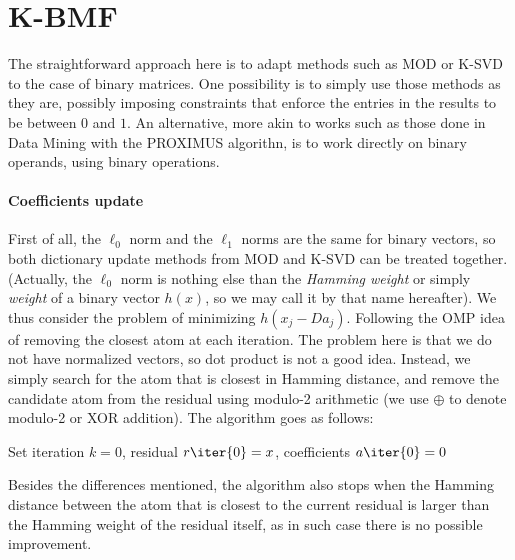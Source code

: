 \documentclass[a4paper]{IEEEtran}
\begin{document}
\section{K-BMF}

The straightforward approach here is to adapt methods such as MOD or K-SVD to the case of binary matrices. One possibility is to simply use those methods as they are, possibly imposing constraints that enforce the entries in the results to be between $0$ and $1$.
An alternative, more akin to works such as those done in Data Mining with the PROXIMUS algorithn, is to work directly on binary operands, using binary operations. 

\paragraph{Coefficients update}

First of all, the $\ell_0$ norm and the $\ell_1$ norms are the same for binary vectors, so both dictionary update methods from MOD and K-SVD can be treated together. (Actually, the $\ell_0$ norm is nothing else than the \emph{Hamming weight} or simply \emph{weight} of a binary vector $h(x)$, so we may call it by that name hereafter). 
We thus consider the problem of minimizing $h(x_j - Da_j)$. Following the OMP idea of removing the closest atom at each iteration. The problem here is that we do not have normalized vectors, so dot product is not a good idea. 
Instead, we simply search for the atom that is closest in Hamming distance, and remove the candidate atom from the residual using modulo-2 arithmetic (we use $\oplus$ to denote modulo-2 or XOR addition). The algorithm goes as follows:

\begin{algorithm}[ht]
Set iteration $k=0$, residual $r\iter{0}=x$, coefficients $a\iter{0}=0$\;
\label{alg:bmp}
\end{algorithm}

Besides the differences mentioned, the algorithm also stops when the Hamming distance between the atom that is closest to the current residual is larger than the Hamming weight of the residual itself, as in such case there is no possible improvement.
 
\end{document}

